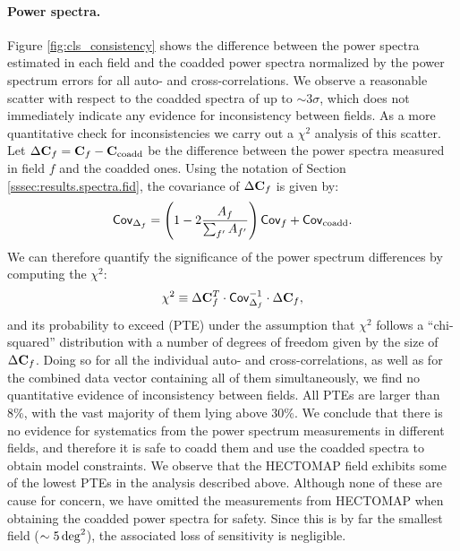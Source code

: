 \documentclass[a4paper,11pt]{article}
\begin{document}
      \paragraph{Power spectra.} Figure \ref{fig:cls_consistency} shows the difference between the power spectra estimated in each field and the coadded power spectra normalized by the power spectrum errors for all auto- and cross-correlations. We observe a reasonable scatter with respect to the coadded spectra of up to $\sim3\sigma$, which does not immediately indicate any evidence for inconsistency between fields. As a more quantitative check for inconsistencies we carry out a $\chi^2$ analysis of this scatter. Let  $\Delta {\bf C}_f={\bf C}_f-{\bf C}_{\rm coadd}$ be the difference between the power spectra measured in field $f$ and the coadded ones. Using the notation of Section \ref{sssec:results.spectra.fid}, the covariance of $\Delta {\bf C}_f$ is given by:
      \begin{equation}
        {\sf Cov}_{\Delta_f}=\left(1-2\frac{A_f}{\sum_{f'}A_{f'}}\right){\sf Cov}_f+{\sf Cov}_{\rm coadd}.
      \end{equation}
      We can therefore quantify the significance of the power spectrum differences by computing the $\chi^2$:
      \begin{equation}
        \chi^2\equiv\Delta{\bf C}_f^T\cdot{\sf Cov}_{\Delta_f}^{-1}\cdot\Delta{\bf C}_f,
      \end{equation}
      and its probability to exceed (PTE) under the assumption that $\chi^2$ follows a ``chi-squared'' distribution with a number of degrees of freedom given by the size of $\Delta{\bf C}_f$. Doing so for all the individual auto- and cross-correlations, as well as for the combined data vector containing all of them simultaneously, we find no quantitative evidence of inconsistency between fields. All PTEs are larger than 8\%, with the vast majority of them lying above 30\%. We conclude that there is no evidence for systematics from the power spectrum measurements in different fields, and therefore it is safe to coadd them and use the coadded spectra to obtain model constraints. We observe that the HECTOMAP field exhibits some of the lowest PTEs in the analysis described above. Although none of these are cause for concern, we have omitted the measurements from HECTOMAP when obtaining the coadded power spectra for safety. Since this is by far the smallest field ($\sim5\,{\rm deg}^2$), the associated loss of sensitivity is negligible.
\end{document}
